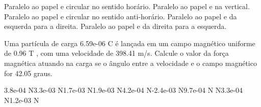 \documentclass[12pt, addpoints]{exam}
\begin{document}
\begin{questions}
\begin{multicols*}{2}
\begin{choices}
\choice Paralelo ao papel e circular no sentido horário. 
\choice Paralelo ao papel e na vertical. 
\choice Paralelo ao papel e circular no sentido anti-horário. 
\choice Paralelo ao papel e da esquerda para a direita. 
\choice Paralelo ao papel e da direita para a esquerda. 
\end{choices}
\question Uma partícula de carga 6.59e-06 C é lançada em um campo magnético uniforme de    0.96 T , com uma velocidade de 398.41 m/s. Calcule o valor da força magnética atuando na carga se o ângulo entre a velocidade e o campo magnético for   42.05 graus.

\begin{oneparchoices}
\choice 3.8e-04 N\choice 3.3e-03 N\choice 1.7e-03 N\choice 1.9e-03 N\choice 4.2e-04 N\choice -2.4e-03 N\choice 9.7e-04 N N\choice 3.3e-04 N\choice 1.2e-03 N
\end{oneparchoices}\end{multicols*}
\end{questions}
\newpage
\end{document}
